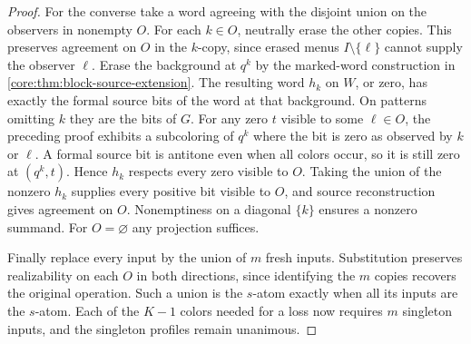 \begin{proof}
For the converse take a word agreeing with the disjoint union on
the observers in nonempty $O$. For each $k\in O$, neutrally erase
the other copies. This preserves agreement on $O$ in the $k$-copy,
since erased menus $I\setminus\{\ell\}$ cannot supply the observer
$\ell$. Erase the background at $q^k$ by the marked-word construction
in \cref{core:thm:block-source-extension}. The resulting word $h_k$
on $W$, or zero, has exactly the formal source bits of the word at
that background. On patterns omitting $k$ they are the bits of $G$.
For any zero $t$ visible to some $\ell\in O$, the preceding proof
exhibits a subcoloring of $q^k$ where the bit is zero as observed
by $k$ or $\ell$. A formal source bit is antitone even when all
colors occur, so it is still zero at $(q^k,t)$. Hence $h_k$ respects
every zero visible to $O$. Taking the union of the nonzero $h_k$
supplies every positive bit visible to $O$, and source reconstruction
gives agreement on $O$. Nonemptiness on a diagonal $\{k\}$ ensures
a nonzero summand. For $O=\varnothing$ any projection suffices.

Finally replace every input by the union of $m$ fresh inputs.
Substitution preserves realizability on each $O$ in both directions,
since identifying the $m$ copies recovers the original operation.
Such a union is the $s$-atom exactly when all its inputs are the
$s$-atom. Each of the $K-1$ colors needed for a loss now requires
$m$ singleton inputs, and the singleton profiles remain unanimous.
\end{proof}
